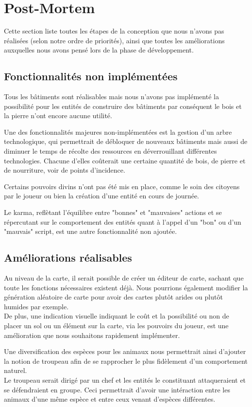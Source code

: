 \documentclass[a4paper]{memoir}
\begin{document}
	\chapter{Post-Mortem}
		Cette section liste toutes les étapes de la conception que nous n'avons pas réalisées (selon notre ordre de priorités), ainsi que toutes les améliorations auxquelles nous avons pensé lors de la phase de développement.
		
		\section{Fonctionnalités non implémentées}
			Tous les bâtiments sont réalisables mais nous n'avons pas implémenté la possibilité pour les entités de construire des bâtiments par conséquent le bois et la pierre n'ont encore aucune utilité. 
			
			Une des fonctionnalités majeures non-implémentées est la gestion d'un arbre technologique, qui permettrait de débloquer de nouveaux bâtiments mais aussi de diminuer le temps de récolte des ressources en déverrouillant différentes technologies. Chacune d'elles coûterait une certaine quantité de bois, de pierre et de nourriture, voir de points d'incidence. 
			
			Certains pouvoirs divins n'ont pas été mis en place, comme le soin des citoyens par le joueur ou bien la création d'une entité en cours de journée. 
			
			Le karma, reflètant l'équilibre entre "bonnes" et "mauvaises" actions et se répercutant sur le comportement des entités quant à l'appel d'un "bon" ou d'un "mauvais" script, est une autre fonctionnalité non ajoutée.
			
		\section{Améliorations réalisables}
			Au niveau de la carte, il serait possible de créer un éditeur de carte, sachant que toute les fonctions nécessaires existent déjà. Nous pourrions également modifier la génération aléatoire de carte pour avoir des cartes plutôt arides ou plutôt humides par exemple.\\
			De plus, une indication visuelle indiquant le coût et la possibilité ou non de placer un sol ou un élément sur la carte, via les pouvoirs du joueur, est une amélioration que nous souhaitons rapidement implémenter.
			
			Une diversification des espèces pour les animaux nous permettrait ainsi d'ajouter la notion de troupeau afin de se rapprocher le plus fidèlement d'un comportement naturel.\\
			Le troupeau serait dirigé par un chef et les entités le constituant attaqueraient et se défendraient en groupe. Ceci permettrait d'avoir une intéraction entre les animaux d'une même espèce et entre ceux venant d'espèces différentes.
			
\end{document}
